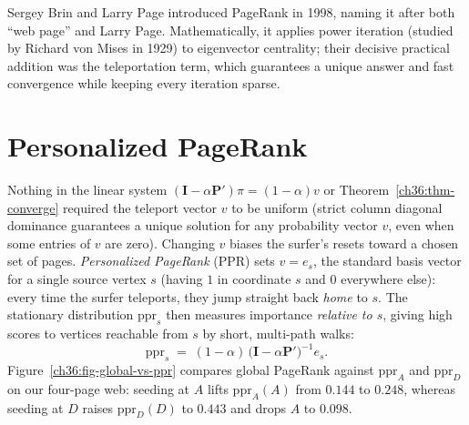\begin{marginnotebox}
Sergey Brin and Larry Page introduced PageRank in 1998, naming it after both ``web page'' and Larry Page. Mathematically, it applies power iteration (studied by Richard von Mises in 1929) to eigenvector centrality; their decisive practical addition was the teleportation term, which guarantees a unique answer and fast convergence while keeping every iteration sparse.
\end{marginnotebox}

\section{Personalized PageRank}
\label{ch36:ppr}

Nothing in the linear system $(\mathbf{I}-\alpha\mathbf{P}')\pi = (1-\alpha)v$ or Theorem~\ref{ch36:thm-converge} required the teleport vector $v$ to be uniform (strict column diagonal dominance guarantees a unique solution for any probability vector $v$, even when some entries of $v$ are zero). Changing $v$ biases the surfer's resets toward a chosen set of pages. \emph{Personalized PageRank} (PPR) sets $v = e_s$, the standard basis vector for a single source vertex $s$ (having $1$ in coordinate $s$ and $0$ everywhere else): every time the surfer teleports, they jump straight back \emph{home} to $s$. The stationary distribution $\mathrm{ppr}_s$ then measures importance \emph{relative to $s$}, giving high scores to vertices reachable from $s$ by short, multi-path walks:
\[
  \boxed{\;\mathrm{ppr}_s \;=\; (1-\alpha)\,\big(\mathbf{I} - \alpha\mathbf{P}'\big)^{-1} e_s.\;}
\]
Figure~\ref{ch36:fig-global-vs-ppr} compares global PageRank against $\mathrm{ppr}_A$ and $\mathrm{ppr}_D$ on our four-page web: seeding at $A$ lifts $\mathrm{ppr}_A(A)$ from $0.144$ to $0.248$, whereas seeding at $D$ raises $\mathrm{ppr}_D(D)$ to $0.443$ and drops $A$ to $0.098$.

